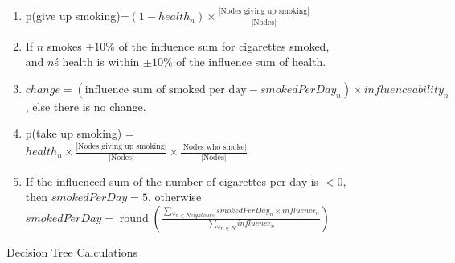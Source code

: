 \documentclass[]{article}
\begin{document}
\begin{enumerate}
\begin{figure}
	\begin{enumerate}
		\item p(give up smoking)=$(1-health_{n}) \times \frac{|\text{Nodes giving up smoking}|}{|\text{Nodes}|}$ \\
		\item If $n$ smokes $\pm10\%$ of the influence sum for cigarettes smoked, and $n$\'s health is within $\pm10\%$ of the influence sum of health. \\
		\item $change = (\text{influence sum of smoked per day} - {smokedPerDay}_{n}) \times influenceability_{n}$, else there is no change. \\
		\item p(take up smoking) = $health_{n} \times \frac{|\text{Nodes giving up smoking}|}{|\text{Nodes}|} \times \frac{|\text{Nodes who smoke}|}{|\text{Nodes}|}$ \\
		\item If the influenced sum of the number of cigarettes per day is $< 0$, then $smokedPerDay = 5$, otherwise \\
		$smokedPerDay = \operatorname{round}(\frac{\sum_{\forall n \in Neighbours} smokedPerDay_{n} \times influence_{n}}{\sum_{\forall n \in N} influence_{n}})$
	\end{enumerate}
	\label{decTreeProbs}
	\caption{Decision Tree Calculations}
\end{figure}


\end{enumerate}
\end{document}

